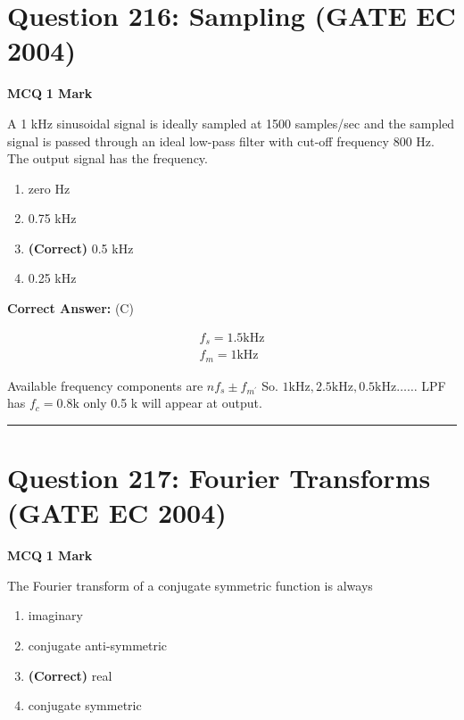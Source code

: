 \documentclass[11pt,a4paper]{article}
\begin{document}
\section*{Question 216: Sampling (GATE EC 2004)}
\noindent \textbf{\color{primary}MCQ} \hfill \textbf{\color{secondary}1 Mark}


\noindent A 1 kHz sinusoidal signal is ideally sampled at 1500 samples/sec and the sampled signal is passed through an ideal low-pass filter with cut-off frequency 800 Hz. The output signal has the frequency.


\begin{enumerate}[label=(\Alph*)]
    \item zero Hz
    \item 0.75 kHz
    \item \textbf{(Correct)} 0.5 kHz
    \item 0.25 kHz
\end{enumerate}

\noindent \textbf{Correct Answer:} (C)

\begin{tcolorbox}[solbox, title=Detailed Solution -- Question 216]
\[
\begin{array}{l} f_{s}=1.5 \mathrm{kHz} \\ f_{m}=1 \mathrm{kHz} \end{array}
\]

 Available frequency components are $n f_{s} \pm f_{m^{\prime}}$
 So. $1 \mathrm{kHz}, 2.5 \mathrm{kHz}, 0.5 \mathrm{kHz} \ldots \ldots$
 LPF has $f_{c}=0.8 \mathrm{k}$
 only 0.5 k will appear at output.
\end{tcolorbox}

\vspace{1.5em}
\hrule
\vspace{1.5em}

\section*{Question 217: Fourier Transforms (GATE EC 2004)}
\noindent \textbf{\color{primary}MCQ} \hfill \textbf{\color{secondary}1 Mark}


\noindent The Fourier transform of a conjugate symmetric function is always


\begin{enumerate}[label=(\Alph*)]
    \item imaginary
    \item conjugate anti-symmetric
    \item \textbf{(Correct)} real
    \item conjugate symmetric
\end{enumerate}
\end{document}
